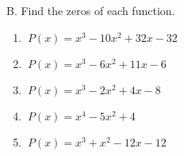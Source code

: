 B. Find the zeros of each function. 

\begin{enumerate}[label = \arabic*. ]
\item \hspce $\ {P(x) = x^3-10x^2+32x-32}$
\vspce
\item \hspce $\ {P(x) = x^3-6x^2+11x-6}$
\vspce
\item \hspce $\ {P(x) = x^3-2x^2+4x-8}$
\vspce
\item \hspce $\ {P(x) = x^4-5x^2+4}$
\vspce
\item \hspce $\ {P(x) = x^3+x^2-12x-12}$
\end{enumerate}  